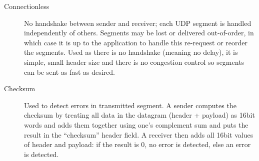 \documentclass{article}
\begin{document}
\begin{description}
    \item[Connectionless] No handshake between sender and receiver; each UDP segment is handled
    independently of others. Segments may be lost or delivered out-of-order, in which case it is up
    to the application to handle this re-request or reorder the segments. Used as there is no handshake
    (meaning no delay), it is simple, small header size and there is no congestion control so segments
    can be sent as fast as desired.
    
    \item[Checksum] Used to detect errors in transmitted segment. A sender computes the checksum by
    treating all data in the datagram (header + payload) as 16bit words and adds them together using
    one's complement sum and puts the result in the ``checksum'' header field. A receiver then adds
    all 16bit values of header and payload: if the result is $0$, no error is detected, else an error
    is detected.
    

\end{description}
\end{document}
